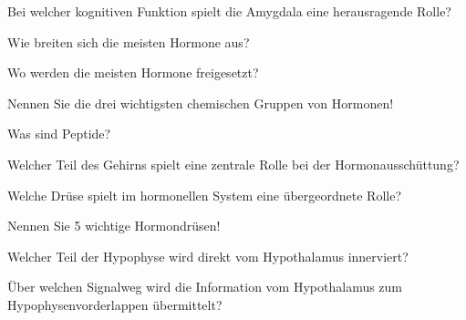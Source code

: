 \documentclass[10pt, a4paper]{exam}
\begin{document}
\begin{questions}
\begin{solution}
  \end{solution}

  \question Bei welcher kognitiven Funktion spielt die Amygdala eine herausragende Rolle?
  \begin{solution}

  \end{solution}

  \question Wie breiten sich die meisten Hormone aus?
  \begin{solution}

  \end{solution}

  \question Wo werden die meisten Hormone freigesetzt?
  \begin{solution}

  \end{solution}

  \question Nennen Sie die drei wichtigsten chemischen Gruppen von Hormonen!
  \begin{solution}

  \end{solution}

  \question Was sind Peptide?
  \begin{solution}

  \end{solution}

  \question Welcher Teil des Gehirns spielt eine zentrale Rolle bei der Hormonausschüttung?
  \begin{solution}

  \end{solution}

  \question Welche Drüse spielt im hormonellen System eine übergeordnete Rolle?
  \begin{solution}

  \end{solution}

  \question Nennen Sie 5 wichtige Hormondrüsen!
  \begin{solution}

  \end{solution}

  \question Welcher Teil der Hypophyse wird direkt vom Hypothalamus innerviert?
  \begin{solution}

  \end{solution}

  \question Über welchen Signalweg wird die Information vom Hypothalamus zum Hypophysenvorderlappen übermittelt?
  \begin{solution}


\end{solution}
\end{questions}
\end{document}
